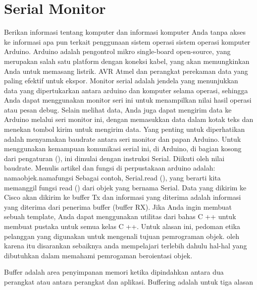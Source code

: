\section{Serial Monitor}
Berikan informasi tentang komputer dan informasi komputer Anda tanpa akses ke informasi apa pun terkait penggunaan sistem operasi sistem operasi komputer Arduino. Arduino adalah pengontrol mikro single-board open-source, yang merupakan salah satu platform dengan koneksi kabel, yang akan memungkinkan Anda untuk memasang listrik. AVR Atmel dan perangkat perekaman data yang paling efektif untuk ekspor.
Monitor serial adalah jendela yang menunjukkan data yang dipertukarkan antara arduino dan komputer selama operasi, sehingga Anda dapat menggunakan monitor seri ini untuk menampilkan nilai hasil operasi atau pesan debug. Selain melihat data, Anda juga dapat mengirim data ke Arduino melalui seri monitor ini, dengan memasukkan data dalam kotak teks dan menekan tombol kirim untuk mengirim data. Yang penting untuk diperhatikan adalah menyamakan baudrate antara seri monitor dan papan Arduino. 
Untuk menggunakan kemampuan komunikasi serial ini, di Arduino, di bagian kosong dari pengaturan (), ini dimulai dengan instruksi Serial. Diikuti oleh nilai baudrate.
Menulis artikel dan fungsi di perpustakaan arduino adalah: namaobjek.namafungsi
Sebagai contoh, Serial.read (), yang berarti kita memanggil fungsi read () dari objek yang bernama Serial.
Data yang dikirim ke Cisco akan dikirim ke buffer Tx dan informasi yang diterima adalah informasi yang diterima dari penerima buffer (buffer RX).
Jika Anda ingin membuat sebuah template, Anda dapat menggunakan utilitas dari bahas C ++ untuk membuat pustaka untuk semua kelas C ++. Untuk alasan ini, pedoman etika pelanggan yang digunakan untuk mengenali tujuan pemrograman objek. oleh karena itu disarankan sebaiknya anda mempelajari terlebih dahulu hal-hal yang dibutuhkan dalam memahami pemrogaman beroientasi objek.

Buffer adalah area penyimpanan memori ketika dipindahkan antara dua perangkat atau antara perangkat dan aplikasi. Buffering adalah untuk tiga alasan
